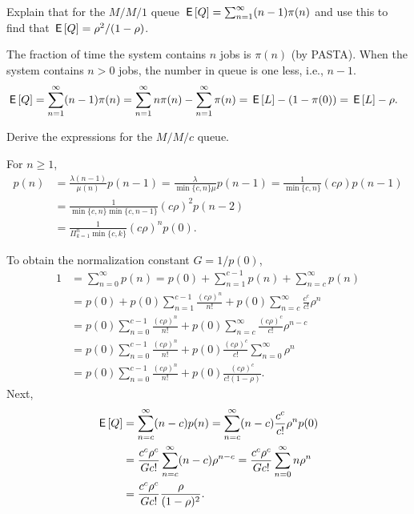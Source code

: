 \begin{exercise}
 Explain that for the $M/M/1$ queue $\,\mathsf{E}\left[Q\right] = \sum_{n=1}^\infty (n-1)\pi(n)$ and use this to find that $\,\mathsf{E}\left[Q\right]=\rho^2/(1-\rho)$.
\begin{solution}
 The fraction of time the system contains $n$ jobs is $\pi(n)$ (by
 PASTA). When the system contains $n>0$ jobs, the number in queue
 is one less, i.e., $n-1$.
\begin{align*}
\,\mathsf{E}\left[Q\right]
&= \sum_{n=1}^\infty (n-1)\pi(n)
=\sum_{n=1}^\infty n\pi(n) -\sum_{n=1}^\infty \pi(n)
= \,\mathsf{E}\left[L\right] - (1-\pi(0)) = \,\mathsf{E}\left[L\right] - \rho.
\end{align*}
\end{solution}
\end{exercise}



\begin{exercise}\label{ex:7}
Derive the expressions for the  $M/M/c$ queue.
\begin{solution}
  For $n\geq 1$,
 \begin{align*}
 p(n)
 &= \frac{\lambda(n-1)}{\mu(n)}p(n-1)
 = \frac{\lambda}{\min\{c, n\} \mu }p(n-1)
 = \frac{1}{\min\{c, n\}}(c\rho) p(n-1) \\
 & = \frac{1}{\min\{c, n\}\min\{c, n-1\}}(c\rho)^2 p(n-2) \\
 &= \frac{1}{\Pi_{k=1}^{n}\min\{c, k\}}(c\rho)^{n} p(0).
 \end{align*}


To obtain the normalization constant $G = 1/p(0)$,
\begin{align*}
1 &= \sum_{n=0}^\infty p(n)
= p(0) + \sum_{n=1}^{c-1} p(n) + \sum_{n=c}^\infty p(n) \\
&=p(0) + p(0) \sum_{n=1}^{c-1}\frac{(c\rho)^n}{n!} +
 p(0)\sum_{n=c}^{\infty} \frac{c^c}{c!} \rho^{n} \\
&=p(0)\sum_{n=0}^{c-1}\frac{(c\rho)^n}{n!} +
 p(0) \sum_{n=c}^{\infty} \frac{(c\rho)^c}{c!} \rho^{n-c} \\
&=
p(0)\sum_{n=0}^{c-1}\frac{(c\rho)^n}{n!} +
p(0)\frac{(c\rho)^c}{c!} \sum_{n=0}^{\infty} \rho^n \\
&=
p(0) \sum_{n=0}^{c-1}\frac{(c\rho)^n}{n!} +
p(0)\frac{(c\rho)^c}{c!(1-\rho)}.
\end{align*}
Next,
\begin{align*}
 \,\mathsf{E}\left[Q\right]
&=\sum_{n=c}^\infty (n-c) p(n)
=\sum_{n=c}^\infty (n-c) \frac{c^c}{c!}\rho^{n} p(0) \\
&=\frac{c^c\rho^c}{G c!} \sum_{n=c}^\infty (n-c) \rho^{n-c}
=\frac{c^c\rho^c}{G c!} \sum_{n=0}^\infty n \rho^n \\
&=\frac{c^c\rho^c}{G c!} \frac{\rho}{(1-\rho)^2}.
\end{align*}


\end{solution}
\end{exercise}
